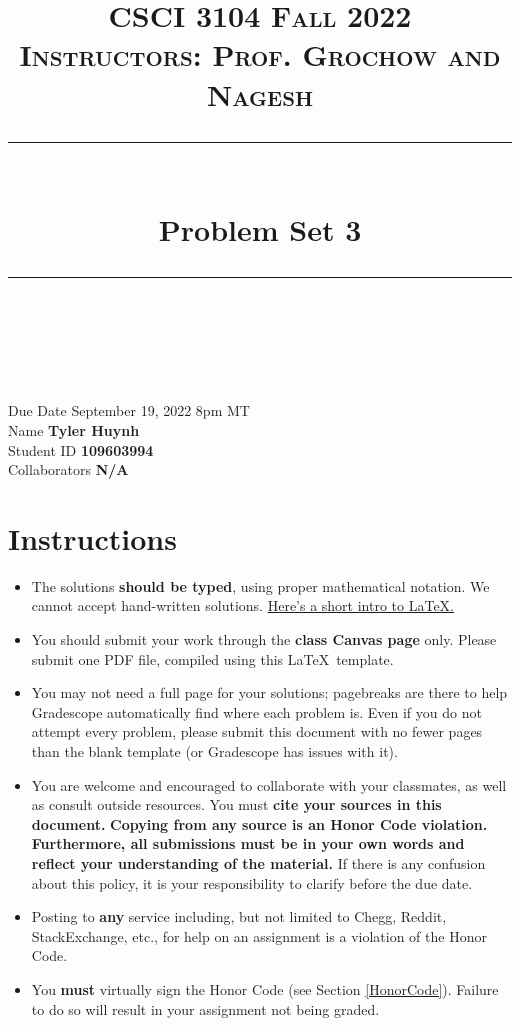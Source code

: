 \documentclass[11pt]{article}
\title{
\normalfont \normalsize 
\textsc{CSCI 3104 Fall 2022 \\ 
Instructors: Prof. Grochow and Nagesh} \\
[10pt] 
\rule{\linewidth}{0.5pt} \\[6pt] 
\huge Problem Set 3 \\
\rule{\linewidth}{2pt}  \\[10pt]
}
\date{}
\theoremstyle{definition}
\theoremstyle{definition}
\theoremstyle{definition}
\begin{document}

\maketitle


\noindent
Due Date \dotfill September 19, 2022 8pm MT\\
Name \dotfill \textbf{Tyler Huynh} \\
Student ID \dotfill \textbf{109603994} \\
Collaborators \dotfill \textbf{N/A}

\tableofcontents

\section*{Instructions}

 \begin{itemize}
	\item The solutions \textbf{should be typed}, using proper mathematical notation. We cannot accept hand-written solutions. \href{http://ece.uprm.edu/~caceros/latex/introduction.pdf}{Here's a short intro to \LaTeX.}
	\item You should submit your work through the \textbf{class Canvas page} only. Please submit one PDF file, compiled using this \LaTeX \ template.
	\item You may not need a full page for your solutions; pagebreaks are there to help Gradescope automatically find where each problem is. Even if you do not attempt every problem, please submit this document with no fewer pages than the blank template (or Gradescope has issues with it).

	\item You are welcome and encouraged to collaborate with your classmates, as well as consult outside resources. You must \textbf{cite your sources in this document.} \textbf{Copying from any source is an Honor Code violation. Furthermore, all submissions must be in your own words and reflect your understanding of the material.} If there is any confusion about this policy, it is your responsibility to clarify before the due date. 

	\item Posting to \textbf{any} service including, but not limited to Chegg, Reddit, StackExchange, etc., for help on an assignment is a violation of the Honor Code.

	\item You \textbf{must} virtually sign the Honor Code (see Section \ref{HonorCode}). Failure to do so will result in your assignment not being graded.
\end{itemize}
\end{document}
